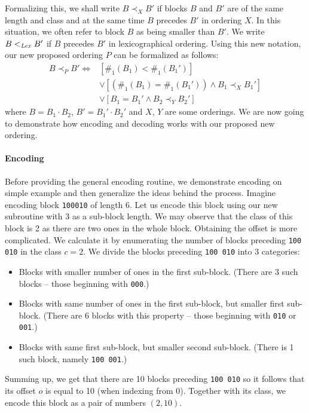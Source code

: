 Formalizing this, we shall write $B\prec_X B'$ if blocks $B$ and $B'$ are of
the same length and class and at the same time $B$ precedes $B'$ in ordering $X$.
In this situation, we often refer to block $B$ as being smaller than $B'$.
We write $B<_{\mathit{Lex}} B'$ if $B$ precedes $B'$ in lexicographical ordering.
Using this new notation, our new proposed ordering $P$ can be formalized as follows:
\begin{align*}
    B\prec_P B' \iff
    &[\#_1(B_1) < \#_1(B_1')] \\
    &\lor [(\#_1(B_1) = \#_1(B_1')) \land B_1 \prec_{X} B_1']\\
    &\lor [B_1 = B_1' \land B_2 \prec_{Y} B_2']
\end{align*}
where $B=B_1\cdot B_2$, $B'=B_1'\cdot B_2'$ and $X$, $Y$ are some orderings. We are now
going to demonstrate how encoding and decoding works with our proposed new ordering.

\paragraph{Encoding}

Before providing the general encoding routine, we demonstrate encoding on
simple example and then generalize the ideas behind the process. Imagine encoding
block {\tt 100010} of length 6. Let us encode this block using our new
subroutine with 3 as a sub-block length. We may observe that the class of this
block is 2 as there are two ones in the whole block. Obtaining the offset is
more complicated. We calculate it by enumerating the number of blocks preceding
{\tt 100 010} in the class $c=2$. We divide the blocks preceding {\tt 100 010}
into 3 categories:
\begin{itemize}
    \item Blocks with smaller number of ones in the first sub-block.
    (There are 3 such blocks -- those beginning with {\tt 000}.)
    \item Blocks with same number of ones in the first sub-block, but smaller first sub-block.
    (There are 6 blocks with this property -- those beginning with {\tt 010} or {\tt 001}.)
    \item Blocks with same first sub-block, but smaller second sub-block.
    (There is 1 such block, namely {\tt 100 001}.)
\end{itemize}
Summing up, we get that there are 10 blocks preceding {\tt 100 010} so it follows
that its offset $o$ is equal to 10 (when indexing from 0). Together with its class,
we encode this block as a pair of numbers $(2, 10)$.

